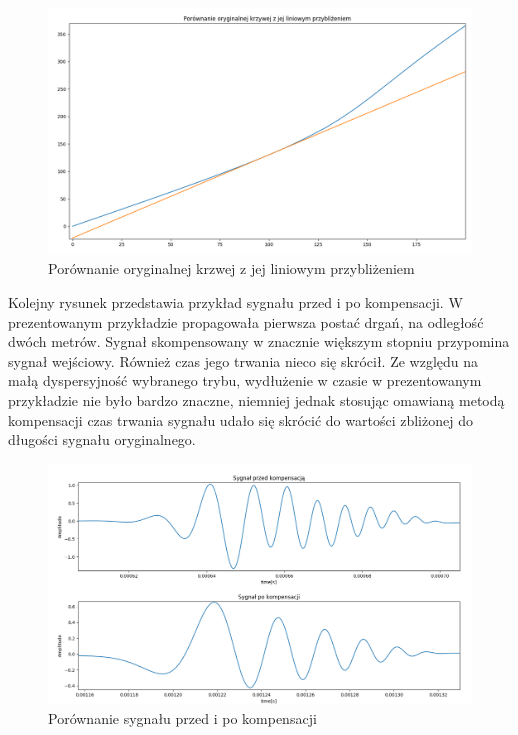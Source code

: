 \begin{figure}[h]
\centering
\includegraphics[width=13cm]{Zdjecia/4/taylor_porownanie_trzecie}
\caption{Porównanie oryginalnej krzwej z jej liniowym przybliżeniem}
\label{fig:taylor porownanie2}
\end{figure}

Kolejny rysunek przedstawia przykład sygnału przed i po kompensacji. W prezentowanym przykładzie propagowała pierwsza postać drgań, na odległość dwóch metrów. Sygnał skompensowany w znacznie większym stopniu przypomina sygnał wejściowy. Również czas jego trwania nieco się skrócił. Ze względu na małą dyspersyjność wybranego trybu, wydłużenie w czasie w prezentowanym przykładzie nie było bardzo znaczne, niemniej jednak stosując omawianą metodą kompensacji czas trwania sygnału udało się skrócić do wartości zbliżonej do długości sygnału oryginalnego.

\begin{figure}[h]
\centering
\includegraphics[width=13cm]{Zdjecia/4/taylor_pierwszy_prim}
\caption{Porównanie sygnału przed i po kompensacji}
\label{fig:taylor pierwsza}
\end{figure}



